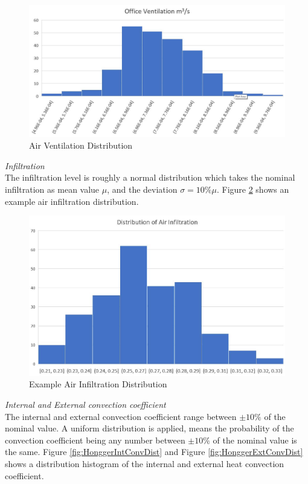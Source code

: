 \documentclass[a4paper, oneside]{discothesis}
\begin{document}
			\begin{figure}[ht!]
			\centering
			\includegraphics[scale=0.35]{Office_Vent.jpg}
			\caption{Air Ventilation Distribution}
			\label{fig:VentDist}
			\end{figure}
						
		\textit{Infiltration}\\
			The infiltration level is roughly a normal distribution which takes the nominal infiltration as mean value $\mu$, and the deviation $\sigma = 10\% \mu$. Figure \ref{fig:EXPAirInfiltration_Sumatra} shows an example air infiltration distribution.\\

			\begin{figure}[ht!]
			\centering
			\includegraphics[scale=0.35]{Example_Normal_Distribution.jpg}
			\caption{Example Air Infiltration Distribution}
			\label{fig:EXPAirInfiltration_Sumatra}
			\end{figure}
		
		\textit{Internal and External convection coefficient}\\
			The internal and external convection coefficient range between $\pm 10\%$ of the nominal value.
			A uniform distribution is applied, means the probability of the convection coefficient being any number between $\pm 10\%$ of the nominal value is the same. Figure \ref{fig:HonggerIntConvDist} and Figure \ref{fig:HonggerExtConvDist} shows a distribution histogram of the internal and external heat convection coefficient.\\
\end{document}
